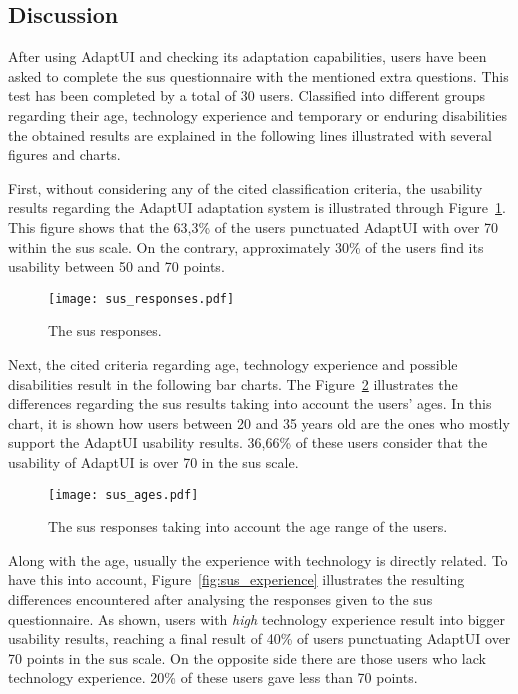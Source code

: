 \subsection{Discussion}
\label{sec:user_evaluation_discussion}

After using AdaptUI and checking its adaptation capabilities, users have been 
asked to complete the \ac{sus} questionnaire with the mentioned extra questions. 
This test has been completed by a total of 30 users. Classified into different 
groups regarding their age, technology experience and temporary or enduring 
disabilities the obtained results are explained in the following lines illustrated 
with several figures and charts.

First, without considering any of the cited classification criteria, the usability 
results regarding the AdaptUI adaptation system is illustrated through 
Figure~\ref{fig:sus_responses}. This figure shows that the 63,3\% of the users
punctuated AdaptUI with over 70 within the \ac{sus} scale. On the contrary, 
approximately 30\% of the users find its usability between 50 and 70 points.

\begin{figure}
\centering
\texttt{[image: sus\_responses.pdf]}
\caption{The \ac{sus} responses.}
\label{fig:sus_responses}
\end{figure}

Next, the cited criteria regarding age, technology experience and possible
disabilities result in the following bar charts. The Figure~\ref{fig:sus_age}
illustrates the differences regarding the \ac{sus} results taking into account the
users' ages. In this chart, it is shown how users between 20 and 35 years old
are the ones who mostly support the AdaptUI usability results. 36,66\% of
these users consider that the usability of AdaptUI is over 70 in the \ac{sus} scale.

\begin{figure}
\centering
\texttt{[image: sus\_ages.pdf]}
\caption{The \ac{sus} responses taking into account the age range of the users.}
\label{fig:sus_age}
\end{figure}

Along with the age, usually the experience with technology is directly related.
To have this into account, Figure~\ref{fig:sus_experience} illustrates the
resulting differences encountered after analysing the responses given to the \ac{sus}
questionnaire. As shown, users with \textit{high} technology experience 
result into bigger usability results, reaching a final result of 40\% of 
users punctuating AdaptUI over 70 points in the \ac{sus} scale. On the opposite side 
there are those users who lack technology experience. 20\% of these 
users gave less than 70 points. 

